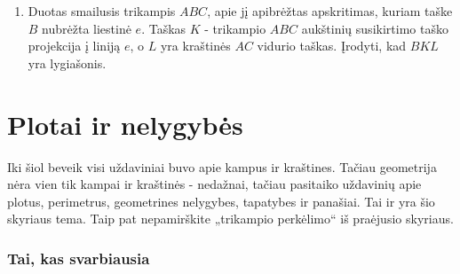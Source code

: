 \begin{enumerate}
\item Duotas smailusis trikampis $ABC$, apie jį apibrėžtas
  apskritimas, kuriam taške $B$ nubrėžta liestinė $e$.
  Taškas $K$ - trikampio $ABC$ aukštinių susikirtimo taško
  projekcija į liniją $e$, o $L$ yra kraštinės $AC$ vidurio
  taškas. Įrodyti, kad $BKL$ yra lygiašonis.
\end{enumerate}

\newpage

\section{Plotai ir nelygybės}

Iki šiol beveik visi uždaviniai buvo apie kampus ir
kraštines. Tačiau geometrija nėra vien tik kampai ir
kraštinės - nedažnai, tačiau pasitaiko uždavinių apie
plotus, perimetrus, geometrines nelygybes, tapatybes ir
panašiai. Tai ir yra šio skyriaus tema. Taip pat
nepamirškite „trikampio perkėlimo“ iš praėjusio skyriaus.

\subsubsection{Tai, kas svarbiausia}

